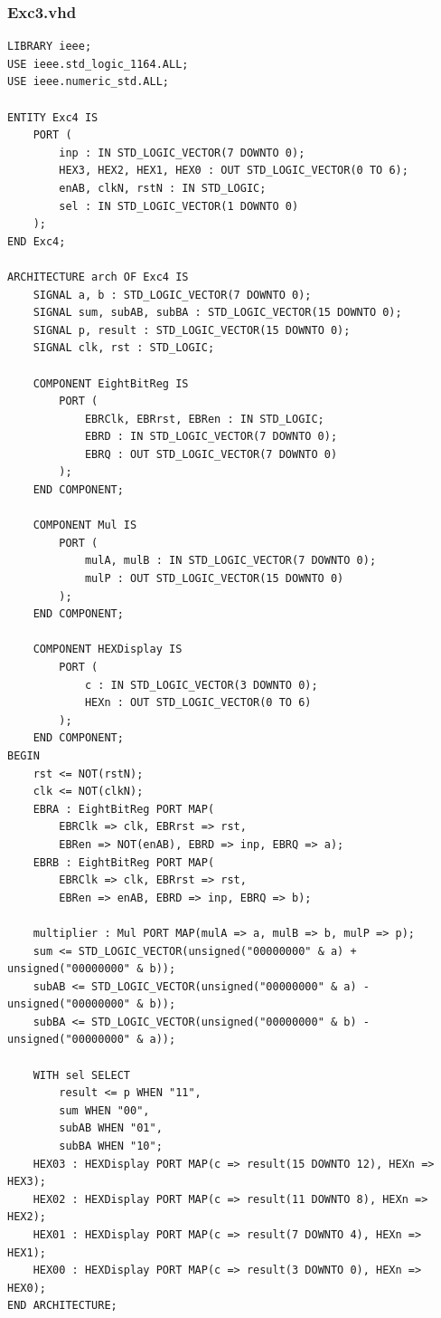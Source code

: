 \documentclass[13pt,a4paper]{report}
\begin{document}
\subsubsection{Exc3.vhd}
\begin{verbatim}
LIBRARY ieee;
USE ieee.std_logic_1164.ALL;
USE ieee.numeric_std.ALL;

ENTITY Exc4 IS
	PORT (
		inp : IN STD_LOGIC_VECTOR(7 DOWNTO 0);
		HEX3, HEX2, HEX1, HEX0 : OUT STD_LOGIC_VECTOR(0 TO 6);
		enAB, clkN, rstN : IN STD_LOGIC;
		sel : IN STD_LOGIC_VECTOR(1 DOWNTO 0)
	);
END Exc4;

ARCHITECTURE arch OF Exc4 IS
	SIGNAL a, b : STD_LOGIC_VECTOR(7 DOWNTO 0);
	SIGNAL sum, subAB, subBA : STD_LOGIC_VECTOR(15 DOWNTO 0);
	SIGNAL p, result : STD_LOGIC_VECTOR(15 DOWNTO 0);
	SIGNAL clk, rst : STD_LOGIC;

	COMPONENT EightBitReg IS
		PORT (
			EBRClk, EBRrst, EBRen : IN STD_LOGIC;
			EBRD : IN STD_LOGIC_VECTOR(7 DOWNTO 0);
			EBRQ : OUT STD_LOGIC_VECTOR(7 DOWNTO 0)
		);
	END COMPONENT;

	COMPONENT Mul IS
		PORT (
			mulA, mulB : IN STD_LOGIC_VECTOR(7 DOWNTO 0);
			mulP : OUT STD_LOGIC_VECTOR(15 DOWNTO 0)
		);
	END COMPONENT;

	COMPONENT HEXDisplay IS
		PORT (
			c : IN STD_LOGIC_VECTOR(3 DOWNTO 0);
			HEXn : OUT STD_LOGIC_VECTOR(0 TO 6)
		);
	END COMPONENT;
BEGIN
	rst <= NOT(rstN);
	clk <= NOT(clkN);
	EBRA : EightBitReg PORT MAP(
		EBRClk => clk, EBRrst => rst,
		EBRen => NOT(enAB), EBRD => inp, EBRQ => a);
	EBRB : EightBitReg PORT MAP(
		EBRClk => clk, EBRrst => rst,
		EBRen => enAB, EBRD => inp, EBRQ => b);

	multiplier : Mul PORT MAP(mulA => a, mulB => b, mulP => p);
	sum <= STD_LOGIC_VECTOR(unsigned("00000000" & a) + unsigned("00000000" & b));
	subAB <= STD_LOGIC_VECTOR(unsigned("00000000" & a) - unsigned("00000000" & b));
	subBA <= STD_LOGIC_VECTOR(unsigned("00000000" & b) - unsigned("00000000" & a));

	WITH sel SELECT
		result <= p WHEN "11",
		sum WHEN "00",
		subAB WHEN "01",
		subBA WHEN "10";
	HEX03 : HEXDisplay PORT MAP(c => result(15 DOWNTO 12), HEXn => HEX3);
	HEX02 : HEXDisplay PORT MAP(c => result(11 DOWNTO 8), HEXn => HEX2);
	HEX01 : HEXDisplay PORT MAP(c => result(7 DOWNTO 4), HEXn => HEX1);
	HEX00 : HEXDisplay PORT MAP(c => result(3 DOWNTO 0), HEXn => HEX0);
END ARCHITECTURE;
\end{verbatim}
\end{document}
